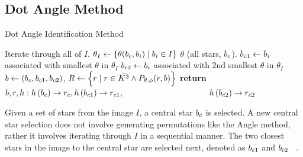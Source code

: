 \subsection{Dot Angle Method}\label{subsec:dotAngleMethod}
\begin{algorithm}
    \caption{Dot Angle Identification Method} \label{algorithm:dotAngleIdentification}
    \begin{algorithmic}[1]
          \Comment Iterate through all of $I$.
        \State $\theta_I \gets \{\theta(b_c, b_i) \mid b_i \in I\}$ \Comment $\theta$
        (all stars, $b_c$).
        \State $b_{c1} \gets b_i$ associated with smallest $\theta$ in $\theta_I$
        \State $b_{c2} \gets b_i$ associated with 2nd smallest $\theta$ in $\theta_I$
        \State $b \gets \left(b_c, b_{c1}, b_{c2}\right)$, $R \gets \left\{  r \mid r \in \bar{K^3} \land
        P_{\theta, \phi}(r, b)  \right\}$
        \State \textbf{return} $b, r, h: h\left(b_c\right) \rightarrow r_c, h\left(b_{c1}\right)
        \rightarrow r_{c1},$
        \State \ \ \ \ \ \ \ \ \ \ \ \ \ \  \ \ \ \ \ \ $h\left(b_{c2}\right) \rightarrow r_{c2}$
        \EndIf
        \EndFor
        \EndFunction
    \end{algorithmic}
\end{algorithm}

Given a set of stars from the image $I$, a central star $b_c$ is selected.
A new central star selection does not involve generating permutations like the Angle method, rather it involves
iterating through $I$ in a sequential manner.
The two closest stars in the image to the central star are selected next, denoted as $b_{c1}$ and $b_{c2}$
~\cite{liebe:starTrackersAttitudeDetermination}.

